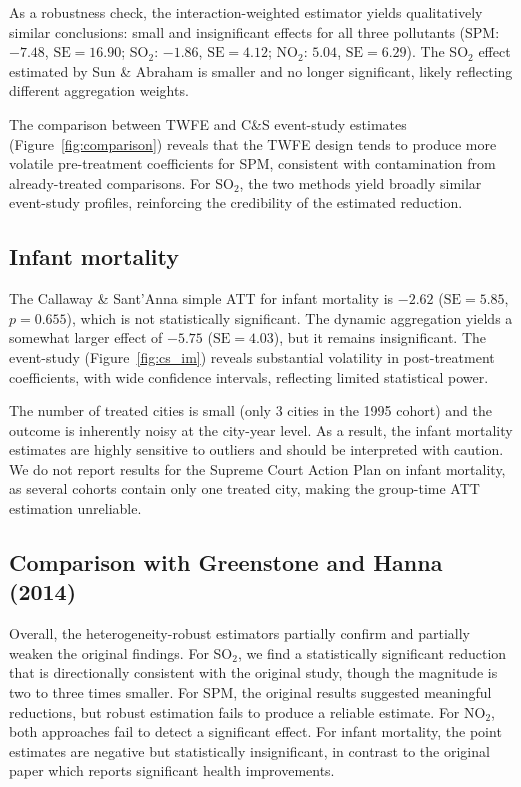 \documentclass[10pt]{article}
\begin{document}
As a robustness check, the \citet{sunab2021} interaction-weighted estimator yields qualitatively similar conclusions: small and insignificant effects for all three pollutants (SPM: $-7.48$, $\text{SE} = 16.90$; SO$_2$: $-1.86$, $\text{SE} = 4.12$; NO$_2$: $5.04$, $\text{SE} = 6.29$). The SO$_2$ effect estimated by Sun \& Abraham is smaller and no longer significant, likely reflecting different aggregation weights.

The comparison between TWFE and C\&S event-study estimates (Figure~\ref{fig:comparison}) reveals that the TWFE design tends to produce more volatile pre-treatment coefficients for SPM, consistent with contamination from already-treated comparisons. For SO$_2$, the two methods yield broadly similar event-study profiles, reinforcing the credibility of the estimated reduction.

\subsection{Infant mortality}

The Callaway \& Sant'Anna simple ATT for infant mortality is $-2.62$ ($\text{SE} = 5.85$, $p = 0.655$), which is not statistically significant. The dynamic aggregation yields a somewhat larger effect of $-5.75$ ($\text{SE} = 4.03$), but it remains insignificant. The event-study (Figure~\ref{fig:cs_im}) reveals substantial volatility in post-treatment coefficients, with wide confidence intervals, reflecting limited statistical power.

The number of treated cities is small (only 3 cities in the 1995 cohort) and the outcome is inherently noisy at the city-year level. As a result, the infant mortality estimates are highly sensitive to outliers and should be interpreted with caution. We do not report results for the Supreme Court Action Plan on infant mortality, as several cohorts contain only one treated city, making the group-time ATT estimation unreliable.

\subsection{Comparison with Greenstone and Hanna (2014)}

Overall, the heterogeneity-robust estimators partially confirm and partially weaken the original findings. For SO$_2$, we find a statistically significant reduction that is directionally consistent with the original study, though the magnitude is two to three times smaller. For SPM, the original results suggested meaningful reductions, but robust estimation fails to produce a reliable estimate. For NO$_2$, both approaches fail to detect a significant effect. For infant mortality, the point estimates are negative but statistically insignificant, in contrast to the original paper which reports significant health improvements.
\end{document}
